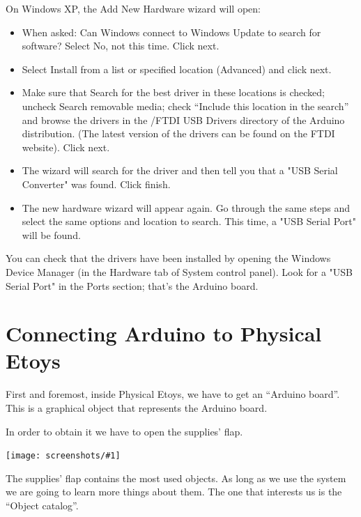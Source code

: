 \documentclass[a4paper,12pt]{article}
\newcommand{\screenshot}[1]
{
\begin{center}
	\texttt{[image: screenshots/\#1]}
\end{center}
}
\begin{document}
On Windows XP, the Add New Hardware wizard will open:

\begin{itemize}
	
	\item When asked: Can Windows connect to Windows Update to search for
	software? Select No, not this time. Click next.

	\item Select Install from a list or specified location (Advanced) and click
	next.

	\item Make sure that Search for the best driver in these locations is
	checked; uncheck Search removable media; check “Include this location in
	the search” and browse the drivers in the /FTDI USB Drivers directory of
	the Arduino distribution. (The latest version of the drivers can be found
	on the FTDI website). Click next.

	\item The wizard will search for the driver and then tell you that a "USB
	Serial Converter" was found. Click finish.

	\item The new hardware wizard will appear again. Go through the same steps
	and select the same options and location to search. This time, a "USB
	Serial Port" will be found.

\end{itemize}

You can check that the drivers have been installed by opening the Windows
Device Manager (in the Hardware tab of System control panel). Look for a "USB
Serial Port" in the Ports section; that's the Arduino board.


\section{Connecting Arduino to Physical Etoys}

First and foremost, inside Physical Etoys, we have to get an “Arduino board”.
This is a graphical object that represents the Arduino board. 

In order to obtain it we have to open the supplies’ flap.

\screenshot{01.png}

The supplies’ flap contains the most used objects.  As long as we use the
system we are going to learn more things about them. The one that interests us
is the “Object catalog”.
\end{document}
